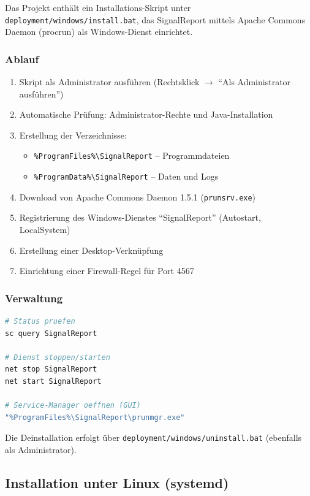 Das Projekt enthält ein Installations-Skript unter
\texttt{deployment/windows/install.bat}, das SignalReport mittels Apache Commons Daemon
(procrun) als Windows-Dienst einrichtet.

\subsubsection{Ablauf}

\begin{enumerate}
  \item Skript als Administrator ausführen (Rechtsklick $\rightarrow$ ``Als Administrator
    ausführen'')
  \item Automatische Prüfung: Administrator-Rechte und Java-Installation
  \item Erstellung der Verzeichnisse:
    \begin{itemize}
      \item \texttt{\%ProgramFiles\%\textbackslash SignalReport} -- Programmdateien
      \item \texttt{\%ProgramData\%\textbackslash SignalReport} -- Daten und Logs
    \end{itemize}
  \item Download von Apache Commons Daemon 1.5.1 (\texttt{prunsrv.exe})
  \item Registrierung des Windows-Dienstes ``SignalReport'' (Autostart, LocalSystem)
  \item Erstellung einer Desktop-Verknüpfung
  \item Einrichtung einer Firewall-Regel für Port 4567
\end{enumerate}

\subsubsection{Verwaltung}

\begin{lstlisting}[language=bash, caption={Windows-Dienst verwalten}]
# Status pruefen
sc query SignalReport

# Dienst stoppen/starten
net stop SignalReport
net start SignalReport

# Service-Manager oeffnen (GUI)
"%ProgramFiles%\SignalReport\prunmgr.exe"
\end{lstlisting}

Die Deinstallation erfolgt über \texttt{deployment/windows/uninstall.bat} (ebenfalls als
Administrator).

\subsection{Installation unter Linux (systemd)}
\label{subsec:install-linux}

